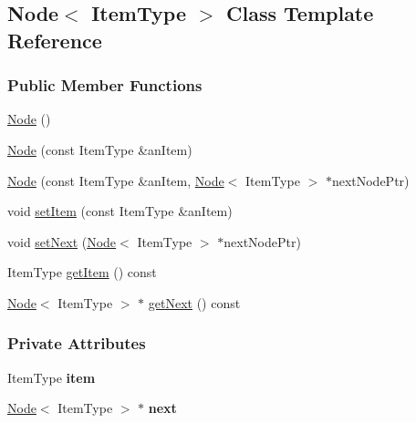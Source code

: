 \hypertarget{class_node}{\subsection{Node$<$ Item\-Type $>$ Class Template Reference}
\label{class_node}
}
\subsubsection*{Public Member Functions}
\begin{DoxyCompactItemize}
\item 
\hyperlink{class_node_a627e94f4fba0e73c546e0fb2a7266f36}{Node} ()
\item 
\hyperlink{class_node_a0288598fcb0244739ce95099c26250ae}{Node} (const Item\-Type \&an\-Item)
\item 
\hyperlink{class_node_adf98d3f9b7227622cb5a0fdd7e8f0b18}{Node} (const Item\-Type \&an\-Item, \hyperlink{class_node}{Node}$<$ Item\-Type $>$ $\ast$next\-Node\-Ptr)
\item 
void \hyperlink{class_node_ab4ceecdecc5df799011de486b9f54974}{set\-Item} (const Item\-Type \&an\-Item)
\item 
void \hyperlink{class_node_a01c1a66d4e39f5b149e090413deb4633}{set\-Next} (\hyperlink{class_node}{Node}$<$ Item\-Type $>$ $\ast$next\-Node\-Ptr)
\item 
Item\-Type \hyperlink{class_node_a4e5519463291a0c1570014f4ee5ca130}{get\-Item} () const 
\item 
\hyperlink{class_node}{Node}$<$ Item\-Type $>$ $\ast$ \hyperlink{class_node_a44fbda8e8d17a37e8203434c2909ea07}{get\-Next} () const 
\end{DoxyCompactItemize}
\subsubsection*{Private Attributes}
\begin{DoxyCompactItemize}
\item 
\hypertarget{class_node_a73e84414314067aa019ba6afb06190bd}{Item\-Type {\bfseries item}}\label{class_node_a73e84414314067aa019ba6afb06190bd}

\item 
\hypertarget{class_node_ad11288556b42a32b4f46ed955b7c31fd}{\hyperlink{class_node}{Node}$<$ Item\-Type $>$ $\ast$ {\bfseries next}}\label{class_node_ad11288556b42a32b4f46ed955b7c31fd}

\end{DoxyCompactItemize}


